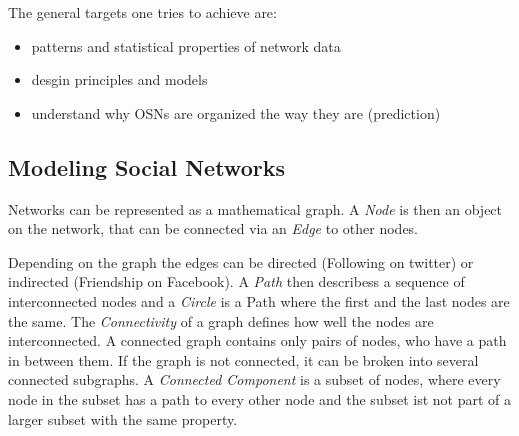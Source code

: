 The general targets one tries to achieve are:\\
\begin{itemize}
	\item patterns and statistical properties of network data
	\item desgin principles and models
	\item understand why OSNs are organized the way they are (prediction)
\end{itemize}

\subsection{Modeling Social Networks} %
\label{sub:modeling_social_networks}
Networks can be represented as a mathematical graph.
A \emph{Node} is then an object on the network,
that can be connected via an \emph{Edge} to other nodes.

Depending on the graph the edges can be directed (Following on twitter)
or indirected (Friendship on Facebook).
A \emph{Path} then describess a sequence of interconnected nodes
and a \emph{Circle} is a Path where the first and the last nodes are the same.
The \emph{Connectivity} of a graph defines how well the nodes are interconnected.
A connected graph contains only pairs of nodes,
who have a path in between them.
If the graph is not connected,
it can be broken into several connected subgraphs.
A \emph{Connected Component} is a subset of nodes,
where every node in the subset has a path to every other node
and the subset ist not part of a larger subset with the same property.

